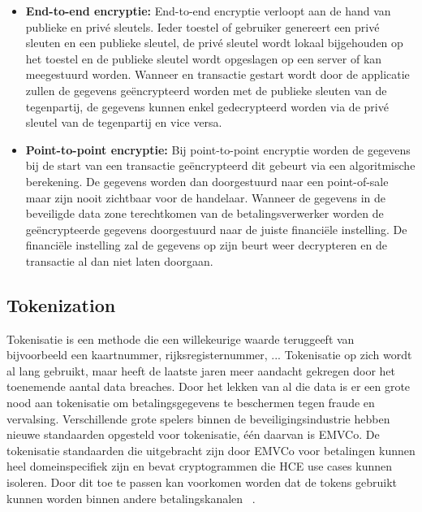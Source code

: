 \begin{itemize}
	\item \textbf{End-to-end encryptie:} End-to-end encryptie verloopt aan de hand van publieke en privé sleutels. Ieder toestel of gebruiker genereert een privé sleuten en een publieke sleutel, de privé sleutel wordt lokaal bijgehouden op het toestel en de publieke sleutel wordt opgeslagen op een server of kan meegestuurd worden. Wanneer en transactie gestart wordt door de applicatie zullen de gegevens geëncrypteerd worden met de publieke sleuten van de tegenpartij, de gegevens kunnen enkel gedecrypteerd worden via de privé sleutel van de tegenpartij en vice versa.  
	
	\item \textbf{Point-to-point encryptie:} Bij point-to-point encryptie worden de gegevens bij de start van een transactie geëncrypteerd dit gebeurt via een algoritmische berekening. De gegevens worden dan doorgestuurd naar een point-of-sale maar zijn nooit zichtbaar voor de handelaar. Wanneer de gegevens in de beveiligde data zone terechtkomen van de betalingsverwerker worden de geëncrypteerde gegevens doorgestuurd naar de juiste financiële instelling. De financiële instelling zal de gegevens op zijn beurt weer decrypteren en de transactie al dan niet laten doorgaan.
\end{itemize}

\subsection{Tokenization}
\label{subsec:tok}
Tokenisatie is een methode die een willekeurige waarde teruggeeft van bijvoorbeeld een kaartnummer, rijksregisternummer, ... Tokenisatie op zich wordt al lang gebruikt, maar heeft de laatste jaren meer aandacht gekregen door het toenemende aantal data breaches. Door het lekken van al die data is er een grote nood aan tokenisatie om betalingsgegevens te beschermen tegen fraude en vervalsing. Verschillende grote spelers binnen de beveiligingsindustrie hebben nieuwe standaarden opgesteld voor tokenisatie, één daarvan is EMVCo. De tokenisatie standaarden die uitgebracht zijn door EMVCo voor betalingen kunnen heel domeinspecifiek zijn en bevat cryptogrammen die HCE use cases kunnen isoleren. Door dit toe te passen kan voorkomen worden dat de tokens gebruikt kunnen worden binnen andere betalingskanalen ~\autocite{SCA2014}.

